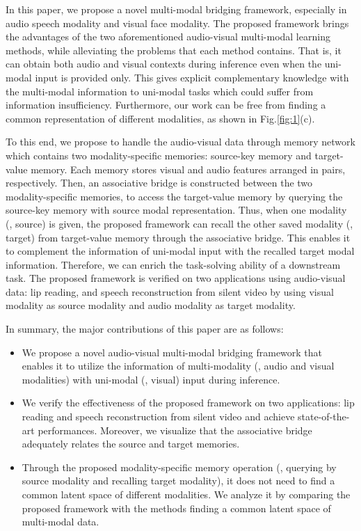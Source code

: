 \documentclass[10pt,twocolumn,letterpaper]{article}
\begin{document}
In this paper, we propose a novel multi-modal bridging framework, especially in audio speech modality and visual face modality. The proposed framework brings the advantages of the two aforementioned audio-visual multi-modal learning methods, while alleviating the problems that each method contains. That is, it can obtain both audio and visual contexts during inference even when the uni-modal input is provided only. This gives explicit complementary knowledge with the multi-modal information to uni-modal tasks which could suffer from information insufficiency. Furthermore, our work can be free from finding a common representation of different modalities, as shown in Fig.\ref{fig:1}(c).

To this end, we propose to handle the audio-visual data through memory network \cite{weston2014memory, miller2016keyvalue} which contains two modality-specific memories: source-key memory and target-value memory. Each memory stores visual and audio features arranged in pairs, respectively. Then, an associative bridge is constructed between the two modality-specific memories, to access the target-value memory by querying the source-key memory with source modal representation. Thus, when one modality (\ie, source) is given, the proposed framework can recall the other saved modality (\ie, target) from target-value memory through the associative bridge. This enables it to complement the information of uni-modal input with the recalled target modal information. Therefore, we can enrich the task-solving ability of a downstream task. The proposed framework is verified on two applications using audio-visual data: lip reading, and speech reconstruction from silent video by using visual modality as source modality and audio modality as target modality.

In summary, the major contributions of this paper are as follows:

\begin{itemize}
  \item We propose a novel audio-visual multi-modal bridging framework that enables it to utilize the information of multi-modality (\ie, audio and visual modalities) with uni-modal (\ie, visual) input during inference.
  \item We verify the effectiveness of the proposed framework on two applications: lip reading and speech reconstruction from silent video and achieve state-of-the-art performances. Moreover, we visualize that the associative bridge adequately relates the source and target memories.
  \item Through the proposed modality-specific memory operation (\ie, querying by source modality and recalling target modality), it does not need to find a common latent space of different modalities. We analyze it by comparing the proposed framework with the methods finding a common latent space of multi-modal data.
\end{itemize}
\end{document}
